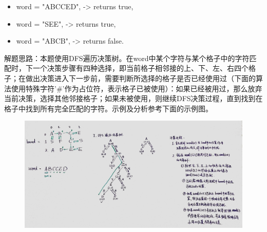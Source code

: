 \documentclass[a4paper,10pt]{article}
\begin{document}
\begin{itemize}
    \item word = "ABCCED", -> returns true,
    \item word = "SEE", -> returns true,
    \item word = "ABCB", -> returns false.
\end{itemize}

\begin{CJK*}{UTF8}{gbsn}
\noindent 解题思路：本题使用DFS遍历决策树。在word中某个字符与某个格子中的字符匹配时，下一个决策步骤有四种选择，即当前格子相邻接的上、下、左、右四个格子；在做出决策进入下一步前，需要判断所选择的格子是否已经使用过（下面的算法使用特殊字符'#'作为占位符，表示格子已被使用）：如果已经被用过，那么放弃当前决策，选择其他邻接格子；如果未被使用，则继续DFS决策过程，直到找到在格子中找到所有完全匹配的字符。示例及分析参考下面的示例图。
\end{CJK*}

\begin{figure}[h]
    \includegraphics[width=1\textwidth]{leetcode79.jpg}
    \centering\\
\end{figure}
\end{document}
